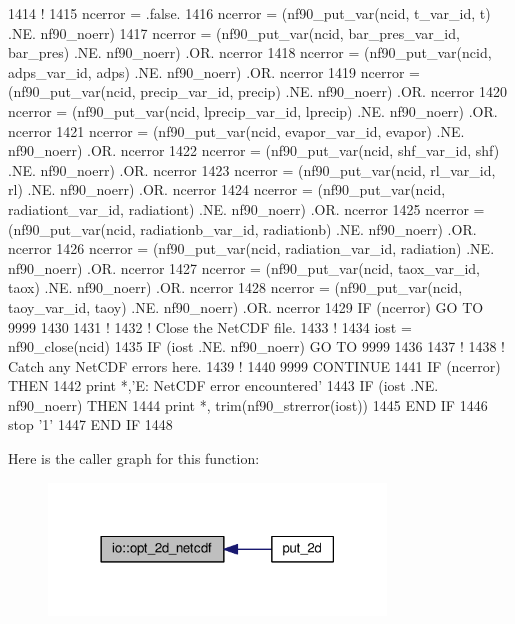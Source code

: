 \begin{DoxyCode}
1414     \textcolor{comment}{!}
1415     ncerror = .false.
1416     ncerror = (nf90\_put\_var(ncid, t\_var\_id, t)                      .NE. nf90\_noerr)
1417     ncerror = (nf90\_put\_var(ncid, bar\_pres\_var\_id, bar\_pres)        .NE. nf90\_noerr) .OR. ncerror
1418     ncerror = (nf90\_put\_var(ncid, adps\_var\_id, adps)                .NE. nf90\_noerr) .OR. ncerror
1419     ncerror = (nf90\_put\_var(ncid, precip\_var\_id, precip)            .NE. nf90\_noerr) .OR. ncerror
1420     ncerror = (nf90\_put\_var(ncid, lprecip\_var\_id, lprecip)          .NE. nf90\_noerr) .OR. ncerror
1421     ncerror = (nf90\_put\_var(ncid, evapor\_var\_id, evapor)            .NE. nf90\_noerr) .OR. ncerror
1422     ncerror = (nf90\_put\_var(ncid, shf\_var\_id, shf)                  .NE. nf90\_noerr) .OR. ncerror
1423     ncerror = (nf90\_put\_var(ncid, rl\_var\_id, rl)                    .NE. nf90\_noerr) .OR. ncerror
1424     ncerror = (nf90\_put\_var(ncid, radiationt\_var\_id, radiationt)    .NE. nf90\_noerr) .OR. ncerror
1425     ncerror = (nf90\_put\_var(ncid, radiationb\_var\_id, radiationb)    .NE. nf90\_noerr) .OR. ncerror
1426     ncerror = (nf90\_put\_var(ncid, radiation\_var\_id, radiation)      .NE. nf90\_noerr) .OR. ncerror
1427     ncerror = (nf90\_put\_var(ncid, taox\_var\_id, taox)                .NE. nf90\_noerr) .OR. ncerror
1428     ncerror = (nf90\_put\_var(ncid, taoy\_var\_id, taoy)                .NE. nf90\_noerr) .OR. ncerror
1429     \textcolor{keywordflow}{IF} (ncerror) \textcolor{keywordflow}{GO TO} 9999
1430 
1431     \textcolor{comment}{!}
1432     \textcolor{comment}{! Close the NetCDF file.}
1433     \textcolor{comment}{!}
1434     iost    = nf90\_close(ncid)
1435     \textcolor{keywordflow}{IF} (iost .NE. nf90\_noerr) \textcolor{keywordflow}{GO TO} 9999
1436 
1437     \textcolor{comment}{!}
1438     \textcolor{comment}{! Catch any NetCDF errors here.}
1439     \textcolor{comment}{!}
1440     9999 \textcolor{keywordflow}{CONTINUE}
1441     \textcolor{keywordflow}{IF} (ncerror) \textcolor{keywordflow}{THEN}
1442         print *,\textcolor{stringliteral}{'E: NetCDF error encountered'}
1443         \textcolor{keywordflow}{IF} (iost .NE. nf90\_noerr) \textcolor{keywordflow}{THEN}
1444             print *, trim(nf90\_strerror(iost))
1445 \textcolor{keywordflow}{        END IF}
1446         stop \textcolor{stringliteral}{'1'}
1447 \textcolor{keywordflow}{    END IF}
1448 
\end{DoxyCode}


Here is the caller graph for this function\+:\nopagebreak
\begin{figure}[H]
\begin{center}
\leavevmode
\includegraphics[width=254pt]{namespaceio_ab6bcb3dc7b4a08b242b7fbd4e11ed319_icgraph}
\end{center}
\end{figure}


